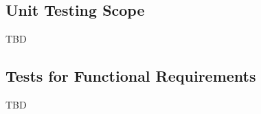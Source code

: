 \documentclass[10pt,titlepage]{article}
\begin{document}

\subsection{Unit Testing Scope}

TBD


\subsection{Tests for Functional Requirements}

TBD





\end{document}
